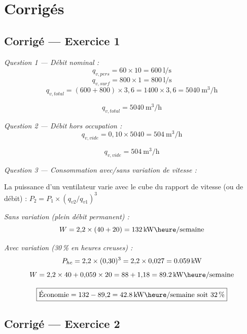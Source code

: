 \newpage
\section*{Corrigés}

\subsection*{Corrigé — Exercice 1}

\textit{Question 1 — Débit nominal :}
\[
  q_{v,pers} = 60 \times 10 = \SI{600}{\litre\per\second}
\]
\[
  q_{v,surf} = 800 \times 1 = \SI{800}{\litre\per\second}
\]
\[
  q_{v,total} = (600 + 800) \times 3{,}6 = 1400 \times 3{,}6 = \SI{5040}{\cubic\metre\per\hour}
\]

\[
  \boxed{q_{v,total} = \SI{5040}{\cubic\metre\per\hour}}
\]

\textit{Question 2 — Débit hors occupation :}
\[
  q_{v,vide} = 0{,}10 \times 5040 = \SI{504}{\cubic\metre\per\hour}
\]

\[
  \boxed{q_{v,vide} = \SI{504}{\cubic\metre\per\hour}}
\]

\textit{Question 3 — Consommation avec/sans variation de vitesse :}

\begin{methode}[title=Loi des similitudes — ventilateur]
La puissance d'un ventilateur varie avec le cube du rapport de vitesse (ou de débit) :
$P_2 = P_1 \times (q_{v2}/q_{v1})^3$
\end{methode}

\textit{Sans variation (plein débit permanent) :}
\[
  W = 2{,}2 \times (40 + 20) = \SI{132}{\kilo\watt\heure\per semaine}
\]

\textit{Avec variation (30\,\% en heures creuses) :}
\[
  P_{hc} = 2{,}2 \times (0{,}30)^3 = 2{,}2 \times 0{,}027 = \SI{0{,}059}{\kilo\watt}
\]
\[
  W = 2{,}2 \times 40 + 0{,}059 \times 20 = 88 + 1{,}18 = \SI{89{,}2}{\kilo\watt\heure\per semaine}
\]

\[
  \boxed{\text{Économie} = 132 - 89{,}2 = \SI{42{,}8}{\kilo\watt\heure\per semaine} \text{ soit } 32\,\%}
\]


\subsection*{Corrigé — Exercice 2}

